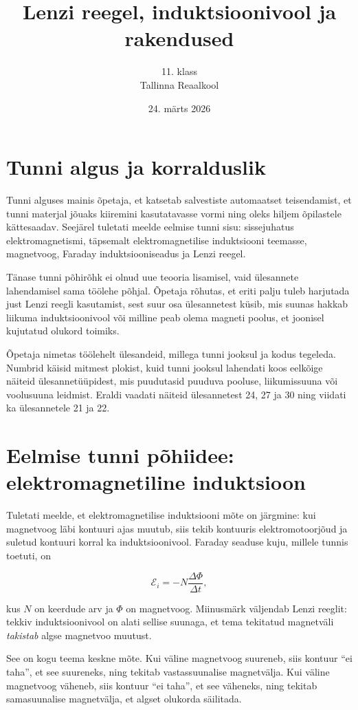 \documentclass[a4paper,11pt]{article}
\title{Lenzi reegel, induktsioonivool ja rakendused}
\author{11. klass \\ Tallinna Reaalkool}
\date{24. märts 2026}
\begin{document}
\maketitle

\section*{Tunni algus ja korralduslik}

Tunni alguses mainis õpetaja, et katsetab salvestiste automaatset teisendamist, et tunni materjal jõuaks kiiremini kasutatavasse vormi ning oleks hiljem õpilastele kättesaadav. Seejärel tuletati meelde eelmise tunni sisu: sissejuhatus elektromagnetismi, täpsemalt elektromagnetilise induktsiooni teemasse, magnetvoog, Faraday induktsiooniseadus ja Lenzi reegel.

Tänase tunni põhirõhk ei olnud uue teooria lisamisel, vaid ülesannete lahendamisel sama töölehe põhjal. Õpetaja rõhutas, et eriti palju tuleb harjutada just Lenzi reegli kasutamist, sest suur osa ülesannetest küsib, mis suunas hakkab liikuma induktsioonivool või milline peab olema magneti poolus, et joonisel kujutatud olukord toimiks.

Õpetaja nimetas töölehelt ülesandeid, millega tunni jooksul ja kodus tegeleda. Numbrid käisid mitmest plokist, kuid tunni jooksul lahendati koos eelkõige näiteid ülesannetüüpidest, mis puudutasid puuduva pooluse, liikumissuuna või voolusuuna leidmist. Eraldi vaadati näiteid ülesannetest 24, 27 ja 30 ning viidati ka ülesannetele 21 ja 22.

\section{Eelmise tunni põhiidee: elektromagnetiline induktsioon}

Tuletati meelde, et elektromagnetilise induktsiooni mõte on järgmine: kui magnetvoog läbi kontuuri ajas muutub, siis tekib kontuuris elektromotoorjõud ja suletud kontuuri korral ka induktsioonivool. Faraday seaduse kuju, millele tunnis toetuti, on

\[
\mathcal{E}_i = -N\frac{\Delta \Phi}{\Delta t},
\]

kus \(N\) on keerdude arv ja \(\Phi\) on magnetvoog. Miinusmärk väljendab Lenzi reeglit: tekkiv induktsioonivool on alati sellise suunaga, et tema tekitatud magnetväli \emph{takistab} algse magnetvoo muutust.

See on kogu teema keskne mõte. Kui väline magnetvoog suureneb, siis kontuur ``ei taha'', et see suureneks, ning tekitab vastassuunalise magnetvälja. Kui väline magnetvoog väheneb, siis kontuur ``ei taha'', et see väheneks, ning tekitab samasuunalise magnetvälja, et algset olukorda säilitada.
\end{document}

